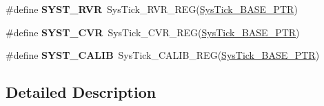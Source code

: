 \begin{DoxyCompactItemize}
\item 
\hypertarget{group___sys_tick___register___accessor___macros_ga4e8efcc1f2b551dbf3cb0aae1231e380}{}\#define {\bfseries S\+Y\+S\+T\+\_\+\+R\+V\+R}~Sys\+Tick\+\_\+\+R\+V\+R\+\_\+\+R\+E\+G(\hyperlink{group___sys_tick___peripheral_gaeef73642fdef722ce658e468dad877ea}{Sys\+Tick\+\_\+\+B\+A\+S\+E\+\_\+\+P\+T\+R})\label{group___sys_tick___register___accessor___macros_ga4e8efcc1f2b551dbf3cb0aae1231e380}

\item 
\hypertarget{group___sys_tick___register___accessor___macros_gae3dc4d2dbfdf38c593a5581415fecfed}{}\#define {\bfseries S\+Y\+S\+T\+\_\+\+C\+V\+R}~Sys\+Tick\+\_\+\+C\+V\+R\+\_\+\+R\+E\+G(\hyperlink{group___sys_tick___peripheral_gaeef73642fdef722ce658e468dad877ea}{Sys\+Tick\+\_\+\+B\+A\+S\+E\+\_\+\+P\+T\+R})\label{group___sys_tick___register___accessor___macros_gae3dc4d2dbfdf38c593a5581415fecfed}

\item 
\hypertarget{group___sys_tick___register___accessor___macros_ga2d37582dd39f59744e340cce09230250}{}\#define {\bfseries S\+Y\+S\+T\+\_\+\+C\+A\+L\+I\+B}~Sys\+Tick\+\_\+\+C\+A\+L\+I\+B\+\_\+\+R\+E\+G(\hyperlink{group___sys_tick___peripheral_gaeef73642fdef722ce658e468dad877ea}{Sys\+Tick\+\_\+\+B\+A\+S\+E\+\_\+\+P\+T\+R})\label{group___sys_tick___register___accessor___macros_ga2d37582dd39f59744e340cce09230250}

\end{DoxyCompactItemize}


\subsection{Detailed Description}
